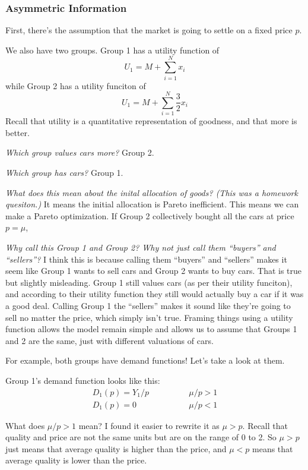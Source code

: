 \documentclass[11pt]{article}
\begin{document}
\subsubsection{Asymmetric Information}

First, there's the assumption that the market is going to settle on a fixed price $p$. 


We also have two groups. Group 1 has a utility function of 
$$U_1 = M + \sum_{i=1}^N x_i$$
while Group 2 has a utility funciton of 
$$U_1 = M + \sum_{i=1}^N \frac{3}{2}x_i$$
Recall that utility is a quantitative representation of goodness, and that more is better. 

{\it Which group values cars more?} Group 2.

{\it Which group has cars?} Group 1.

{\it What does this mean about the inital allocation of goods? (This was a homework quesiton.)} It means the initial allocation is Pareto inefficient. This means we can make a Pareto optimization. If Group 2 collectively bought all the cars at price $p = \mu$, 

{\it Why call this Group 1 and Group 2? Why not just call them ``buyers'' and ``sellers''?} I think this is because calling them ``buyers'' and ``sellers'' makes it seem like Group 1 wants to sell cars and Group 2 wants to buy cars. That is true but slightly misleading. Group 1 still values cars (as per their utility funciton), and according to their utility function they still would actually buy a car if it was a good deal. Calling Group 1 the ``sellers'' makes it sound like they're going to sell no matter the price, which simply isn't true. Framing things using a utility function allows the model remain simple and allows us to assume that Groups 1 and 2 are the same, just with different valuations of cars.

For example, both groups have demand functions! Let's take a look at them.

Group 1's demand function looks like this:
\begin{align*}
D_1(p) = Y_1/p & \qquad \qquad \mu/p > 1 \\
D_1(p) = 0 & \qquad \qquad \mu/p < 1
\end{align*}

What does $\mu/p > 1$ mean? I found it easier to rewrite it as $\mu > p$. Recall that quality and price are not the same units but are on the range of 0 to 2. So $\mu > p$ just means that average quality is higher than the price, and $\mu < p$ means that average quality is lower than the price. 
\end{document}
